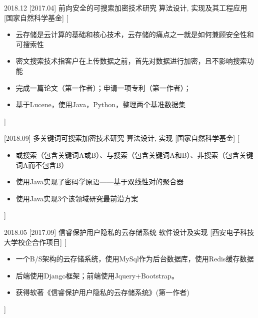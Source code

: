 \documentclass[zh]{resume}
\begin{document}
\begin{experiences}
  \experience
    {2018.12}%
    [2017.04]%
    {前向安全的可搜索加密技术研究}%
    {算法设计, 实现及其工程应用}%
    [国家自然科学基金]%
    [\begin{itemize}
      \item{\icon{\faFlag}} 云存储是云计算的基础和核心技术，云存储的痛点之一就是如何兼顾安全性和可搜索性
      \item{\icon{\faFlag}} 密文搜索技术指客户在上传数据之前，首先对数据进行加密，且不影响搜索功能
      \item{\icon{\faCheck}} 完成一篇论文（第一作者）；申请一项专利（第一作者）；
      \item{\icon{\faCheck}} 基于Lucene，使用Java，Python，整理两个基准数据集  %
    \end{itemize}]%


      \separator{0.2em}
  \experience
    {}
    [2018.09]%
    {多关键词可搜索加密技术研究}%
    {算法设计, 实现}%
    [国家自然科学基金]%
    [\begin{itemize}
      \item{\icon{\faFlag}} 或搜索（包含关键词A或B）、与搜索（包含关键词A和B）、非搜索（包含关键词A而不包含B）
      \item{\icon{\faCheck}} 使用Java实现了密码学原语——基于双线性对的聚合器 
      \item{\icon{\faCheck}} 使用Java实现3个该领域研究最前沿方案     
    \end{itemize}]%


  \separator{0.2em}
  \experience
    {2018.05}%
    [2017.09]%
    {信睿保护用户隐私的云存储系统}%
    {软件设计及实现}%
    [西安电子科技大学校企合作项目]%
    [\begin{itemize}
      \item{\icon{\faFlag}} 一个B/S架构的云存储系统，使用MySql作为后台数据库，使用Redis缓存数据
      \item{\icon{\faFlag}} 后端使用Django框架；前端使用Jquery+Bootstrap。
      \item{\icon{\faCheck}} 获得软著《信睿保护用户隐私的云存储系统》(第一作者)
    \end{itemize}]%




\end{experiences}
\end{document}
